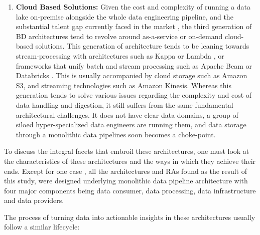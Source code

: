\documentclass{bmcart}
\begin{document}
\begin{enumerate}
    \item \textbf{Cloud Based Solutions:} Given the cost and complexity of running a data lake on-premise alongside the whole data engineering pipeline, and the substantial talent gap currently faced in the market \cite{AtaeiHype}, the third generation of BD architectures tend to revolve around as-a-service or on-demand cloud-based solutions. This generation of architecture tends to be leaning towards stream-processing with architectures such as Kappa or Lambda \cite{lin2017lambda}, or frameworks that unify batch and stream processing such as Apache Beam \cite{ApachBeam} or Databricks \cite{DataBricks}. This is usually accompanied by cloud storage such as Amazon S3, and streaming technologies such as Amazon Kinesis. Whereas this generation tends to solve various issues regarding the complexity and cost of data handling and digestion, it still suffers from the same fundamental architectural challenges. It does not have clear data domains, a group of siloed hyper-specialized data engineers are running them, and data storage through a monolithic data pipelines soon becomes a choke-point.
\end{enumerate}

To discuss the integral facets that embroil these architectures, one must look at the characteristics of these architectures and the ways in which they achieve their ends. Except for one case \cite{AtaeiApsec}, all the architectures and RAs found as the result of this study, were designed underlying monolithic data pipeline architecture with four major components being data consumer, data processing, data infrastructure and data providers.

The process of turning data into actionable insights in these architectures usually follow a similar lifecycle:
\end{document}

